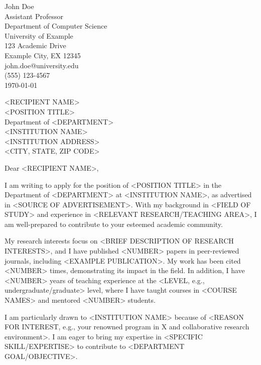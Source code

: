 \documentclass[
    language=english,
    doctype=cover-letter,
    institution=none,
    titlestyle=simple
]{../../omnilatex}
\begin{document}
\begin{minipage}{\textwidth}
    \raggedright
    John Doe\\
    Assistant Professor\\
    Department of Computer Science\\
    University of Example\\
    123 Academic Drive\\
    Example City, EX 12345\\
    john.doe@university.edu\\
    (555) 123-4567\\
    \today
\end{minipage}

\vspace{1cm}

\begin{minipage}{\textwidth}
    \raggedright
    <RECIPIENT NAME>\\
    <POSITION TITLE>\\
    Department of <DEPARTMENT>\\
    <INSTITUTION NAME>\\
    <INSTITUTION ADDRESS>\\
    <CITY, STATE, ZIP CODE>
\end{minipage}

\vspace{1cm}

\vspace{1cm}

Dear <RECIPIENT NAME>,

I am writing to apply for the position of <POSITION TITLE> in the Department of <DEPARTMENT> at <INSTITUTION NAME>, as advertised in <SOURCE OF ADVERTISEMENT>. With my background in <FIELD OF STUDY> and experience in <RELEVANT RESEARCH/TEACHING AREA>, I am well-prepared to contribute to your esteemed academic community.

My research interests focus on <BRIEF DESCRIPTION OF RESEARCH INTERESTS>, and I have published <NUMBER> papers in peer-reviewed journals, including <EXAMPLE PUBLICATION>. My work has been cited <NUMBER> times, demonstrating its impact in the field. In addition, I have <NUMBER> years of teaching experience at the <LEVEL, e.g., undergraduate/graduate> level, where I have taught courses in <COURSE NAMES> and mentored <NUMBER> students.

I am particularly drawn to <INSTITUTION NAME> because of <REASON FOR INTEREST, e.g., your renowned program in X and collaborative research environment>. I am eager to bring my expertise in <SPECIFIC SKILL/EXPERTISE> to contribute to <DEPARTMENT GOAL/OBJECTIVE>.
\end{document}
